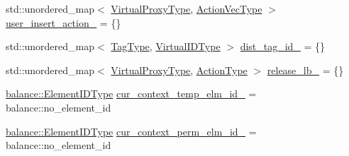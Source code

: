 \begin{DoxyCompactItemize}
\item 
std\+::unordered\+\_\+map$<$ \hyperlink{namespacevt_a1b417dd5d684f045bb58a0ede70045ac}{Virtual\+Proxy\+Type}, \hyperlink{structvt_1_1vrt_1_1collection_1_1_collection_manager_a51650235f0e53ae08381942eba822679}{Action\+Vec\+Type} $>$ \hyperlink{structvt_1_1vrt_1_1collection_1_1_collection_manager_a8d436079bfbadeacdf0584b01c150c29}{user\+\_\+insert\+\_\+action\+\_\+} = \{\}
\item 
std\+::unordered\+\_\+map$<$ \hyperlink{namespacevt_a84ab281dae04a52a4b243d6bf62d0e52}{Tag\+Type}, \hyperlink{namespacevt_1_1vrt_a84d0891f52f70728c3fc2172cffb464b}{Virtual\+I\+D\+Type} $>$ \hyperlink{structvt_1_1vrt_1_1collection_1_1_collection_manager_ac6d4e3a2e80c670dc5c31c0c02ec0e1f}{dist\+\_\+tag\+\_\+id\+\_\+} = \{\}
\item 
std\+::unordered\+\_\+map$<$ \hyperlink{namespacevt_a1b417dd5d684f045bb58a0ede70045ac}{Virtual\+Proxy\+Type}, \hyperlink{namespacevt_ae0a5a7b18cc99d7b732cb4d44f46b0f3}{Action\+Type} $>$ \hyperlink{structvt_1_1vrt_1_1collection_1_1_collection_manager_a42ea6d7733a75f09738a877e90db9aa1}{release\+\_\+lb\+\_\+} = \{\}
\item 
\hyperlink{namespacevt_1_1vrt_1_1collection_1_1balance_a14c8d2c972f2913aa3f1636e5be0a120}{balance\+::\+Element\+I\+D\+Type} \hyperlink{structvt_1_1vrt_1_1collection_1_1_collection_manager_a0ed427a8b00190e291d7ad7cfa4932f1}{cur\+\_\+context\+\_\+temp\+\_\+elm\+\_\+id\+\_\+} = balance\+::no\+\_\+element\+\_\+id
\item 
\hyperlink{namespacevt_1_1vrt_1_1collection_1_1balance_a14c8d2c972f2913aa3f1636e5be0a120}{balance\+::\+Element\+I\+D\+Type} \hyperlink{structvt_1_1vrt_1_1collection_1_1_collection_manager_adbf8f335a30a005a3d5923a96f6f40c9}{cur\+\_\+context\+\_\+perm\+\_\+elm\+\_\+id\+\_\+} = balance\+::no\+\_\+element\+\_\+id
\end{DoxyCompactItemize}
